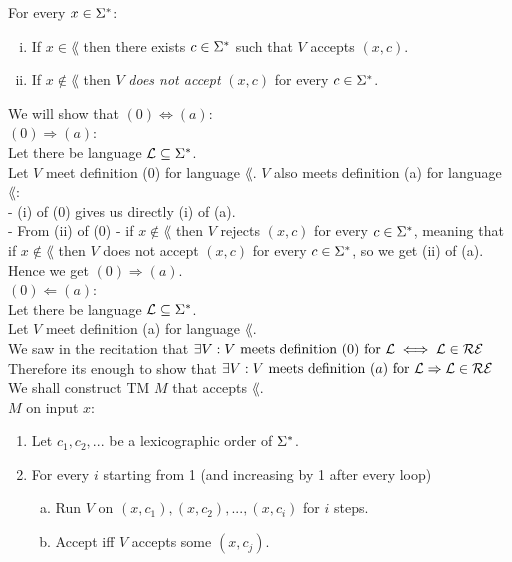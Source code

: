 For every $x \in \Sigma^*$:
\begin{enumerate}[(i)]
    \item If $x \in \lang$ then there exists $c \in \Sigma^*$ such that $V$ accepts $(x, c)$.
    \item If $x \notin \lang$ then $V$ \textit{does not accept} $(x, c)$ for every $c \in \Sigma^*$.
\end{enumerate}

We will show that $(0) \iff (a)$: \\

\underline{$(0) \Rightarrow (a)$}: \\
Let there be language $\mathcal{L} \subseteq \Sigma^*$. \\
Let $V$ meet definition (0) for language $\lang$. $V$ also meets definition (a) for language $\lang$: \\
- (i) of (0) gives us directly (i) of (a). \\
- From (ii) of (0) - if $x \notin \lang$ then $V$ rejects $(x, c)$ for every $c \in \Sigma^*$,
meaning that if $x \notin \lang$ then $V$ does not accept $(x, c)$ for every $c \in \Sigma^*$,
so we get (ii) of (a). \\
Hence we get $(0) \Rightarrow (a)$. \\

\underline{$(0) \Leftarrow (a)$}: \\
Let there be language $\mathcal{L} \subseteq \Sigma^*$. \\
Let $V$ meet definition (a) for language $\lang$. \\
We saw in the recitation that $\exists V: V \text{ meets definition } (0) \text{ for } \mathcal{L} \iff \mathcal{L} \in \mathcal{R}\mathcal{E}$ \\
Therefore its enough to show that $\exists V: V \text{ meets definition } (a) \text{ for } \mathcal{L} \Rightarrow \mathcal{L} \in \mathcal{R}\mathcal{E}$ \\
We shall construct TM $M$ that accepts $\lang$. \\
$M$ on input $x$:
\begin{enumerate}[1., itemsep=5pt]

    \item Let $c_1, c_2, ...$ be a lexicographic order of $\Sigma^*$.

    \item For every $i$ starting from 1 (and increasing by 1 after every loop)

          \begin{enumerate}[a., itemsep=5pt]
              \item \qquad Run $V$ on $(x, c_1), (x, c_2), ..., (x, c_i)$ for $i$ steps.

              \item \qquad Accept iff $V$ accepts some $(x, c_j)$.
          \end{enumerate}

\end{enumerate}

